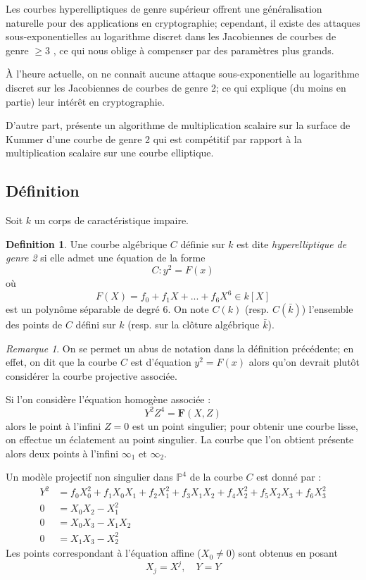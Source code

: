 \documentclass[a4paper,12pt]{article}
\theoremstyle{definition}
\newtheorem{definition}{Definition}[section]
\theoremstyle{remark}
\newtheorem{remarque}{Remarque}
\numberwithin{equation}{section}
\begin{document}
Les courbes hyperelliptiques de genre supérieur offrent une généralisation naturelle pour des applications en cryptographie; cependant, il existe des attaques sous-exponentielles au logarithme discret dans les Jacobiennes de courbes de genre $\geq 3$ \citep{gaudry2}, ce qui nous oblige à compenser par des paramètres plus grands.

À l'heure actuelle, on ne connait aucune attaque sous-exponentielle au logarithme discret sur les Jacobiennes de courbes de genre 2; ce qui explique (du moins en partie) leur intérêt en cryptographie.

D'autre part, \citet{gaudry} présente un algorithme de multiplication scalaire sur la surface de Kummer d'une courbe de genre 2 qui est compétitif par rapport à la multiplication scalaire sur une courbe elliptique.

\subsection{Définition}
Soit $k$ un corps de caractéristique impaire.

\begin{definition}
Une courbe algébrique $C$ définie sur $k$ est dite \emph{hyperelliptique de genre 2} si elle admet une équation de la forme
$$C : y^2 = F(x)$$
où $$F(X) = f_0 + f_1X + ... + f_6X^6 \in k[X]$$
est un polynôme séparable de degré 6. On note $C(k)$ (resp. $C(\bar{k})$) l'ensemble des points de $C$ défini sur $k$ (resp. sur la clôture algébrique $\bar{k}$).
\end{definition}

\begin{remarque}
On se permet un abus de notation dans la définition précédente; en effet, on dit que la courbe $C$ est d'équation $y^2 = F(x)$ alors qu'on devrait plutôt considérer la courbe projective associée.

Si l'on considère l'équation homogène associée :
$$Y^2Z^4 = \mathbf{F}(X,Z)$$
alors le point à l'infini $Z=0$ est un point singulier; pour obtenir une courbe lisse, on effectue un éclatement au point singulier. La courbe que l'on obtient présente alors deux points à l'infini $\infty_1$ et $\infty_2$.

Un modèle projectif non singulier dans $\mathbb{P}^4$ de la courbe $C$ est donné par \citep{cassels-Flynn} :
\begin{align*}
Y^2 &= f_0X_0^2 + f_1X_0X_1 + f_2X_1^2 + f_3X_1X_2 + f_4X_2^2 + f_5X_2X_3 + f_6X_3^2 \\
0 &= X_0X_2 - X_1^2 \\
0 &= X_0X_3 - X_1X_2 \\
0 &= X_1X_3 - X_2^2
\end{align*}
Les points correspondant à l'équation affine ($X_0 \neq 0$) sont obtenus en posant
$$X_j = X^j, \quad Y = Y$$
\end{remarque}
\end{document}
